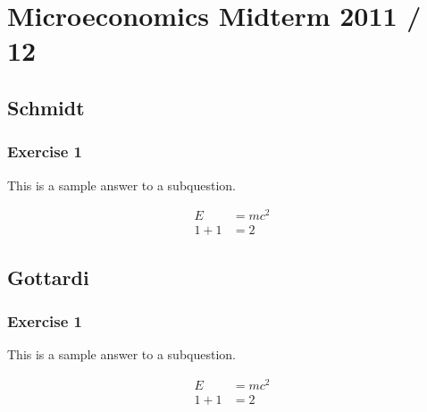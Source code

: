 \section*{Microeconomics Midterm 2011 / 12}

{
\subsection*{Schmidt}

\subsubsection*{Exercise 1}

\begin{enumerate}[label=(\alph*)]
{\item 
This is a sample answer to a subquestion.

\begin{align*}
    E &= mc^2 \\
    1 + 1 &= 2
\end{align*}
}
\end{enumerate}
}

\newpage
{
\subsection*{Gottardi}

\subsubsection*{Exercise 1}

\begin{enumerate}[label=(\alph*)]
{\item 
This is a sample answer to a subquestion.

\begin{align*}
    E &= mc^2 \\
    1 + 1 &= 2
\end{align*}
}
\end{enumerate}
}
